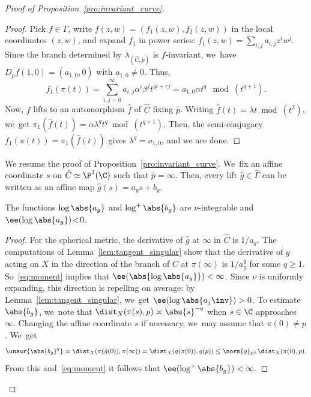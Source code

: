 \begin{proof}[Proof of Proposition~\ref{pro:invariant_curve}]
\begin{proof}
Pick $f\in \Gamma$, write
$f(z,w) = (f_1(z,w), f_2(z,w))$ in the local coordinates $(z,w)$, and expand $f_1$ in power series: $f_1(z,w) = \sum_{i,j} a_{i,j}z^iw^j$.
Since the branch determined by $\lambda_{(\hat C, \hat{p})}$ is $f$-invariant, we~have $D_{p}f(1,0) = (a_{1,0}, 0)$ with $a_{1,0}\neq 0$. Thus,
\begin{equation*} f_1(\pi(t))
= \sum_{i,j=0}^\infty a_{i,j}\alpha^i\beta^j t^{qi+rj}
= a_{1, 0} \alpha t^q \mod(t^{q+1}).
\end{equation*}
Now, $f$ lifts to an automorphism $\hat f$ of $\hat C$ fixing $\hat p$. Writing
$\hat f(t) = \lambda t \bmod(t^2)$, we~get $\pi_1(\hat f(t)) = \alpha \lambda^q t^q \bmod(t^{q+1})$. Then,
the semi-conjugacy $f_1(\pi(t)) = \pi_1(\hat f(t))$ gives $ \lambda^q = a_{1, 0}$, and we are done.
\end{proof}

We resume the proof of Proposition~\ref{pro:invariant_curve}. We~fix an affine coordinate $s$ on $\hat C\simeq \P^1(\C)$ such that $\hat p = \infty$. Then, every lift $\hat g \in \hat\Gamma$ can be written as an affine map $\hat g(s) = a_g s+b_g$.

\begin{lem}\label{lem:integrability}
The functions $\log \abs{a_g}$ and $\log^+\abs{b_g}$ are $\nu$-integrable and \hbox{$\ee( \log \abs{a_g})\!<\!0$}.
\end{lem}

\begin{proof}
For the spherical metric, the derivative of $\hat g$ at $ \infty$ in $\hat C$ is $1/a_g$. The computations
of Lemma~\ref{lem:tangent_singular} show that the derivative
of $g$ acting on $X$ in the direction of the branch of $C$ at $\pi(\infty)$
is $1/a_g^q$ for some $q\geq 1$. So~\eqref{eq:moment} implies that $\ee( \abs{\log \abs{a_g}})<\infty$.
Since $\nu$ is uniformly expanding, this direction
is repelling on average: by Lemma~\ref{lem:tangent_singular}, we~get
$\ee( \log \abs{a_j\inv})>0$.
To estimate $\abs{b_g}$, we~note that
$\dist_X(\pi(s), p) \asymp \abs{s}^{-q}$ when $s\in \C$ approaches $\infty$. Changing the affine coordinate $s$ if necessary, we~may assume that
$\pi(0)\neq p$. We~get
\begin{equation*}
\unsur{\abs{b_g}^q} \asymp \dist_X (\pi(\hat g(0)), \pi(\infty)) = \dist_X(g(\pi(0)), g(p))\leq \norm{g}_{C^1} \dist_X(\pi(0), p).
\end{equation*}
From this and~\eqref{eq:moment} it follows that $\ee(\log^+\abs{b_g})<\infty$.
\end{proof}


\end{proof}
